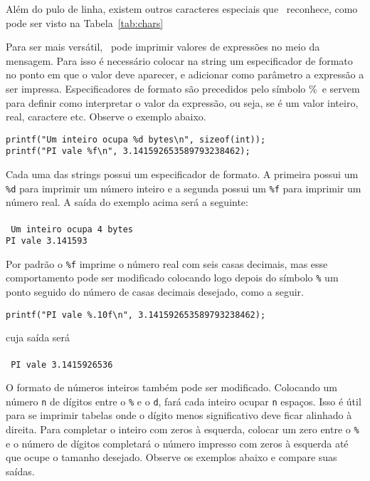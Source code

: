 Além do pulo de linha, existem outros caracteres especiais que \PRINTF\ reconhece, como pode ser visto na Tabela~\ref{tab:chars}

\pagebreak

Para ser mais versátil, \PRINTF\ pode imprimir valores de expressões no meio da mensagem. Para isso é necessário colocar na string um especificador de formato no ponto em que o valor deve aparecer, e adicionar como parâmetro a expressão a ser impressa. Especificadores de formato são precedidos pelo símbolo \%\ e servem para definir como interpretar o valor da expressão, ou seja, se é um valor inteiro, real, caractere etc. Observe o exemplo abaixo.

\begin{lstlisting}
printf("Um inteiro ocupa %d bytes\n", sizeof(int));
printf("PI vale %f\n", 3.141592653589793238462);
\end{lstlisting}

Cada uma das strings possui um especificador de formato. A primeira possui um {\tt \%d} 
para imprimir um número inteiro e a segunda possui um {\tt \%f}
para imprimir um número real.
A saída do exemplo acima será a seguinte:\\
\\
{\tt
Um inteiro ocupa 4 bytes\\
PI vale 3.141593\\
}

Por padrão o {\tt \%f} imprime o número real com seis casas decimais, mas esse comportamento pode ser modificado colocando logo depois do símbolo {\tt \%} um ponto seguido do número de casas decimais desejado, como a seguir.

\begin{lstlisting}
printf("PI vale %.10f\n", 3.141592653589793238462);
\end{lstlisting}

cuja saída será\\
\\
{\tt
PI vale 3.1415926536\\
}

O formato de números inteiros também pode ser modificado. Colocando um número {\tt n} de dígitos entre o {\tt \%} e o {\tt d}, fará cada inteiro ocupar {\tt n} espaços. Isso é útil para se imprimir tabelas onde o dígito menos significativo deve ficar alinhado à direita. Para completar o inteiro com zeros à esquerda, colocar um zero entre o {\tt \%} e o número de dígitos completará o número impresso com zeros à esquerda até que ocupe o tamanho desejado. Observe os exemplos abaixo e compare suas saídas.


